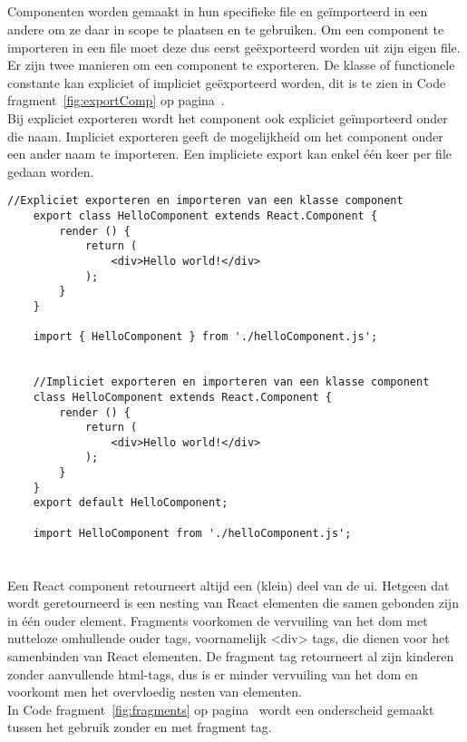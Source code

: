 \subsection{}
\label{sec:exportComp}

Componenten worden gemaakt in hun specifieke file en geïmporteerd in een andere om ze daar in scope te plaatsen en te gebruiken. Om een component te importeren in een file moet deze dus eerst geëxporteerd worden uit zijn eigen file.\\
Er zijn twee manieren om een component te exporteren. De klasse of functionele constante kan expliciet of impliciet geëxporteerd worden, dit is te zien in Code fragment~\ref{fig:exportComp} op pagina~\pageref{fig:exportComp}.\\
Bij expliciet exporteren wordt het component ook expliciet geïmporteerd onder die naam. Impliciet exporteren geeft de mogelijkheid om het component onder een ander naam te importeren. Een impliciete export kan enkel één keer per file gedaan worden.\\

\begin{lstlisting}[caption=Exporteren van een component, label={fig:exportComp}]
    //Expliciet exporteren en importeren van een klasse component
    export class HelloComponent extends React.Component {
        render () {
            return (
                <div>Hello world!</div>
            );
        }
    }
    
    import { HelloComponent } from './helloComponent.js';
    
    
    //Impliciet exporteren en importeren van een klasse component
    class HelloComponent extends React.Component {
        render () {
            return (
                <div>Hello world!</div>
            );
        }
    }
    export default HelloComponent;
    
    import HelloComponent from './helloComponent.js';
\end{lstlisting}


\section{}
\label{sec:fragments}

Een React component retourneert altijd een (klein) deel van de \gls{ui}. Hetgeen dat wordt geretourneerd is een nesting van React elementen die samen gebonden zijn in één ouder element. Fragments voorkomen de vervuiling van het \gls{dom} met nutteloze omhullende ouder tags, voornamelijk <div> tags, die dienen voor het samenbinden van React elementen. De fragment tag retourneert al zijn kinderen zonder aanvullende \gls{html}-tags, dus is er minder vervuiling van het \gls{dom} en voorkomt men het overvloedig nesten van elementen.\\
In Code fragment~\ref{fig:fragments} op pagina~\pageref{fig:fragments} wordt een onderscheid gemaakt tussen het gebruik zonder en met fragment tag.

